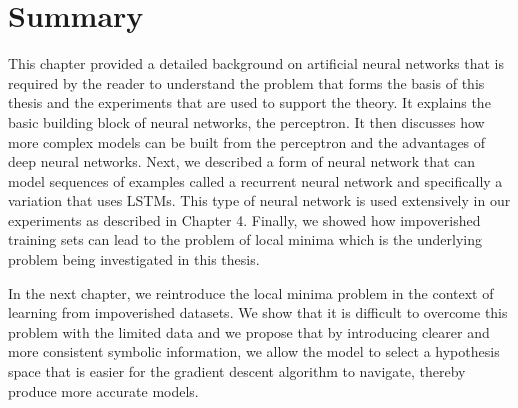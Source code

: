\section{Summary} \label{sec:background-summary}

This chapter provided a detailed background on artificial neural networks that is required by the reader to understand the problem that forms the basis of this thesis and the experiments that are used to support the theory. It explains the basic building block of neural networks, the perceptron. It then discusses how more complex models can be built from the perceptron and the advantages of deep neural networks. Next, we described a form of neural network that can model sequences of examples called a recurrent neural network and specifically a variation that uses LSTMs. This type of neural network is used extensively in our experiments as described in Chapter 4. Finally, we showed how impoverished training sets can lead to the problem of local minima which is the underlying problem being investigated in this thesis.

In the next chapter, we reintroduce the local minima problem in the context of learning from impoverished datasets. We show that it is difficult to overcome this problem with the limited data and we propose that by introducing clearer and more consistent symbolic information, we allow the model to select a hypothesis space that is easier for the gradient descent algorithm to navigate, thereby produce more accurate models.